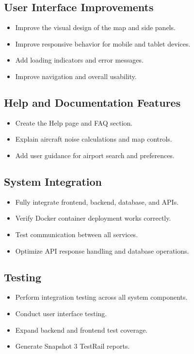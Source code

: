 \documentclass[12pt]{article}
\begin{document}
\subsection{User Interface Improvements}
\begin{itemize}
\item Improve the visual design of the map and side panels.
\item Improve responsive behavior for mobile and tablet devices.
\item Add loading indicators and error messages.
\item Improve navigation and overall usability.
\end{itemize}

\subsection{Help and Documentation Features}
\begin{itemize}
\item Create the Help page and FAQ section.
\item Explain aircraft noise calculations and map controls.
\item Add user guidance for airport search and preferences.
\end{itemize}

\subsection{System Integration}
\begin{itemize}
\item Fully integrate frontend, backend, database, and APIs.
\item Verify Docker container deployment works correctly.
\item Test communication between all services.
\item Optimize API response handling and database operations.
\end{itemize}

\subsection{Testing}
\begin{itemize}
\item Perform integration testing across all system components.
\item Conduct user interface testing.
\item Expand backend and frontend test coverage.
\item Generate Snapshot 3 TestRail reports.
\end{itemize}
\end{document}
